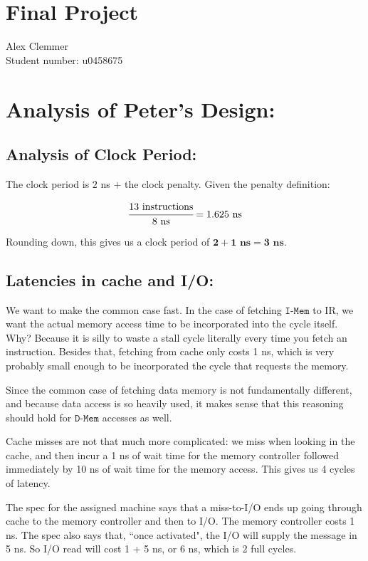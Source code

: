 \documentclass[a4paper]{article}
\begin{document}
\section*{Final Project}
Alex Clemmer\\
Student number: u0458675

\section{Analysis of Peter's Design:}

\subsection{Analysis of Clock Period:}

The clock period is $2$ ns $ + $ the clock penalty. Given the penalty definition:

\begin{equation}
\cfrac{13 \text{ instructions}}{8 \text{ ns}} = 1.625 \text{ ns}
\end{equation}

Rounding down, this gives us a clock period of $\mathbf{2 + 1 \text{ ns} = 3 \text{ ns}}$.

\subsection{Latencies in cache and I/O:}

We want to make the common case fast. In the case of fetching $\texttt{I-Mem}$ to IR, we want the actual memory access time to be incorporated into the cycle itself. Why? Because it is silly to waste a stall cycle literally every time you fetch an instruction. Besides that, fetching from cache only costs 1 ns, which is very probably small enough to be incorporated the cycle that requests the memory.

Since the common case of fetching data memory is not fundamentally different, and because data access is so heavily used, it makes sense that this reasoning should hold for $\texttt{D-Mem}$ accesses as well.

Cache misses are not that much more complicated: we miss when looking in the cache, and then incur a 1 ns of wait time for the memory controller followed immediately by 10 ns of wait time for the memory access. This gives us 4 cycles of latency.

The spec for the assigned machine says that a miss-to-I/O ends up going through cache to the memory controller and then to I/O. The memory controller costs 1 ns. The spec also says that, ``once activated", the I/O will supply the message in 5 ns. So I/O read will cost 1 + 5 ns, or 6 ns, which is 2 full cycles.
\end{document}
